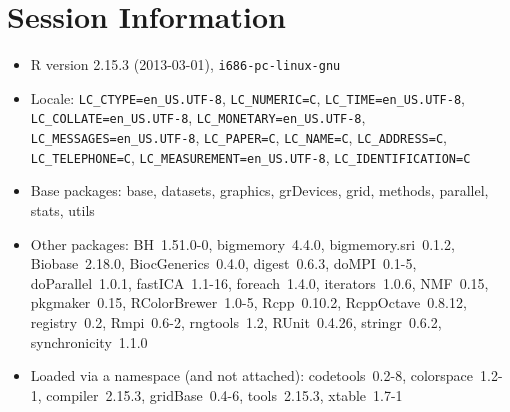 \documentclass[10pt]{article}
\begin{document}
\section*{Session Information}
\begin{itemize}\raggedright
  \item R version 2.15.3 (2013-03-01), \verb|i686-pc-linux-gnu|
  \item Locale: \verb|LC_CTYPE=en_US.UTF-8|, \verb|LC_NUMERIC=C|, \verb|LC_TIME=en_US.UTF-8|, \verb|LC_COLLATE=en_US.UTF-8|, \verb|LC_MONETARY=en_US.UTF-8|, \verb|LC_MESSAGES=en_US.UTF-8|, \verb|LC_PAPER=C|, \verb|LC_NAME=C|, \verb|LC_ADDRESS=C|, \verb|LC_TELEPHONE=C|, \verb|LC_MEASUREMENT=en_US.UTF-8|, \verb|LC_IDENTIFICATION=C|
  \item Base packages: base, datasets, graphics, grDevices, grid,
    methods, parallel, stats, utils
  \item Other packages: BH~1.51.0-0, bigmemory~4.4.0,
    bigmemory.sri~0.1.2, Biobase~2.18.0, BiocGenerics~0.4.0,
    digest~0.6.3, doMPI~0.1-5, doParallel~1.0.1, fastICA~1.1-16,
    foreach~1.4.0, iterators~1.0.6, NMF~0.15, pkgmaker~0.15,
    RColorBrewer~1.0-5, Rcpp~0.10.2, RcppOctave~0.8.12, registry~0.2,
    Rmpi~0.6-2, rngtools~1.2, RUnit~0.4.26, stringr~0.6.2,
    synchronicity~1.1.0
  \item Loaded via a namespace (and not attached): codetools~0.2-8,
    colorspace~1.2-1, compiler~2.15.3, gridBase~0.4-6, tools~2.15.3,
    xtable~1.7-1
\end{itemize}
\end{document}
